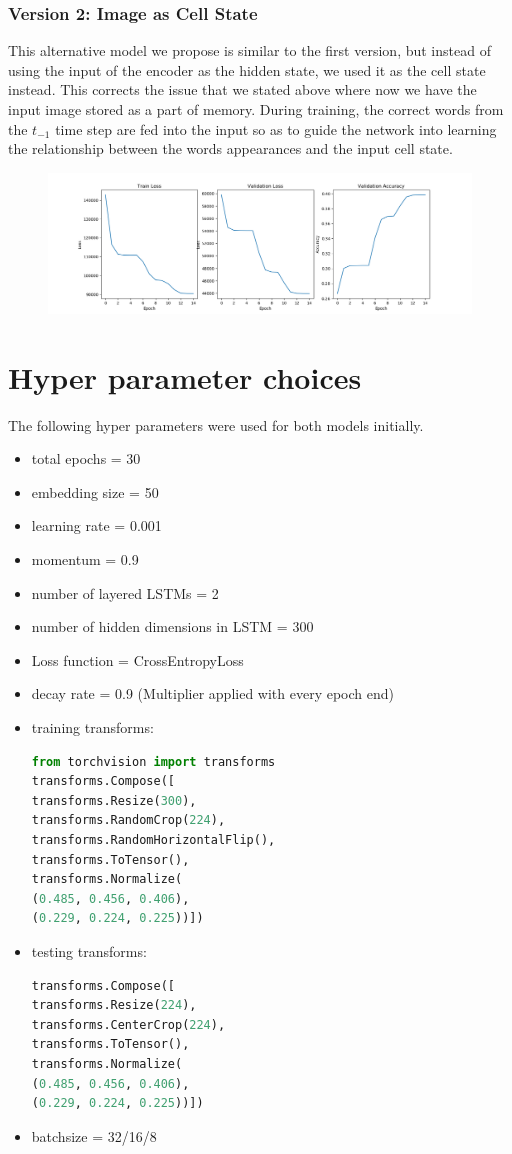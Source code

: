 \documentclass{proc}
\begin{document}
\subsubsection{Version 2: Image as Cell State}
This alternative model we propose is similar to the first version, but instead of using the input of the encoder as the hidden state, we used it as the cell state instead. This corrects the issue that we stated above where now we have the input image stored as a part of memory. During training, the correct words from the $t_{-1}$ time step are fed into the input so as to guide the network into learning the relationship between the words appearances and the input cell state.
\begin{figure}[h!]
  \includegraphics[width=\linewidth]{image_as_state.png}
\end{figure}
\section{Hyper parameter choices}
The following hyper parameters were used for both models initially.
\begin{itemize}
\item total epochs = 30
\item embedding size = 50 
\item learning rate = 0.001 
\item momentum = 0.9
\item number of layered LSTMs = 2
\item number of hidden dimensions in LSTM = 300
\item Loss function = CrossEntropyLoss
\item decay rate = 0.9 (Multiplier applied with every epoch end)
\item training transforms:
\begin{lstlisting}[language = python]
from torchvision import transforms
transforms.Compose([
transforms.Resize(300), 
transforms.RandomCrop(224), 
transforms.RandomHorizontalFlip(),
transforms.ToTensor(), 
transforms.Normalize(
(0.485, 0.456, 0.406),
(0.229, 0.224, 0.225))])
\end{lstlisting}
\item testing transforms:
\begin{lstlisting}[language = python]
transforms.Compose([ 
transforms.Resize(224),
transforms.CenterCrop(224),
transforms.ToTensor(), 
transforms.Normalize(
(0.485, 0.456, 0.406),  
(0.229, 0.224, 0.225))])
\end{lstlisting}
\item batchsize = 32/16/8
\end{itemize}
\end{document}

